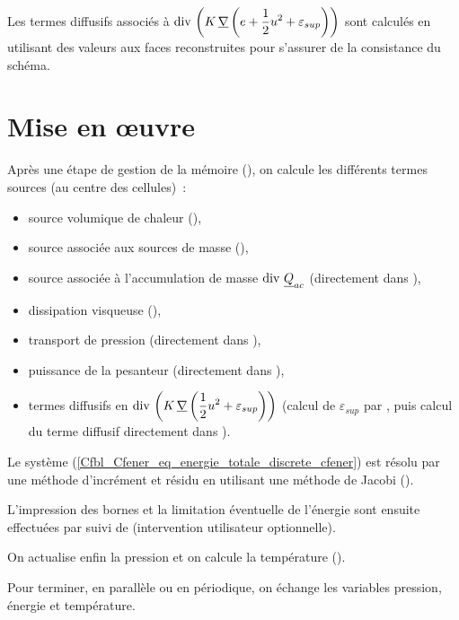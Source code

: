 Les termes diffusifs associés à
$\displaystyle\text{div}\,\left(K\,\underline{\nabla}\left(e+\frac{1}{2} u^2 +
\varepsilon_{sup}\right)\right)$ sont calculés en utilisant des valeurs aux
faces reconstruites pour s'assurer de la consistance du schéma.

\section*{Mise en \oe uvre}


Après une étape de gestion de la mémoire (), on calcule les
différents termes sources (au centre des cellules)~:
\begin{itemize}
\item source volumique de chaleur (),
\item source associée aux sources de masse (),
\item source associée à l'accumulation de masse $\text{div}\,\,\underline{Q}_{ac}$ (directement dans ),
\item dissipation visqueuse (),
\item transport de pression (directement dans ),
\item puissance de la pesanteur (directement dans ),
\item termes diffusifs en $\displaystyle\text{div}\,\left(K\,\underline{\nabla}\left(\frac{1}{2} u^2 +
\varepsilon_{sup}\right)\right)$ (calcul de $\varepsilon_{sup}$ par
, puis calcul du terme diffusif directement dans ).
\end{itemize}

\bigskip
Le système (\ref{Cfbl_Cfener_eq_energie_totale_discrete_cfener}) est résolu par une méthode
d'incrément et résidu  en utilisant une méthode de Jacobi ().

L'impression des bornes et
la limitation éventuelle de l'énergie sont ensuite effectuées par
 suivi de  (intervention utilisateur optionnelle).

On actualise enfin la pression et on calcule la
température ().

Pour
terminer, en parallèle ou en périodique, on échange les variables
pression, énergie et température.



